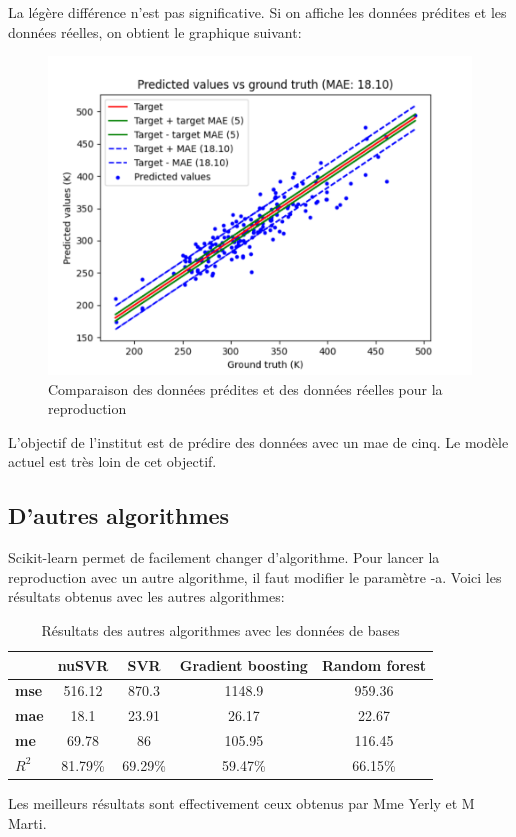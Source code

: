 La légère différence n'est pas significative.
Si on affiche les données prédites et les données réelles, on obtient le graphique suivant:

\begin{figure}[ht]
    \centering
    \includegraphics[width=0.8\columnwidth]{img/graphic_reproduction_result.png}
    \caption{Comparaison des données prédites et des données réelles pour la reproduction}
\end{figure}

L'objectif de l'institut est de prédire des données avec un \acrlong{mae} de cinq.
Le modèle actuel est très loin de cet objectif.

\subsection{D'autres algorithmes}
Scikit-learn permet de facilement changer d'algorithme.
Pour lancer la reproduction avec un autre algorithme, il faut modifier le paramètre -a.
Voici les résultats obtenus avec les autres algorithmes:

\begin{table}[ht]
    \centering
    \begin{tabular}{l|c|c|c|c|}
    \cline{2-5}
    \multicolumn{1}{c|}{\textbf{}}     & \textbf{nuSVR} & \textbf{SVR} & \textbf{Gradient boosting} & \textbf{Random forest} \\ \hline
    \multicolumn{1}{|l|}{\textbf{\acrshort{mse}}} & 516.12         & 870.3        & 1148.9                     & 959.36                 \\ \hline
    \multicolumn{1}{|l|}{\textbf{\acrshort{mae}}} & 18.1           & 23.91        & 26.17                      & 22.67                  \\ \hline
    \multicolumn{1}{|l|}{\textbf{\acrshort{me}}}  & 69.78          & 86           & 105.95                     & 116.45                 \\ \hline
    \multicolumn{1}{|l|}{\textbf{$R^2$}}   & 81.79\%        & 69.29\%      & 59.47\%                    & 66.15\%                \\ \hline
    \end{tabular}%
    \caption{Résultats des autres algorithmes avec les données de bases}
\end{table}

Les meilleurs résultats sont effectivement ceux obtenus par Mme Yerly et M Marti.